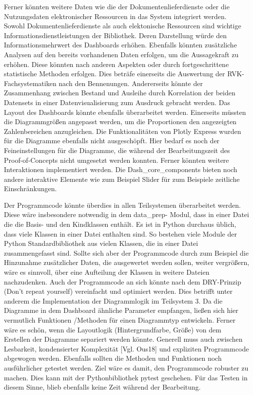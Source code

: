 Ferner könnten weitere Daten wie die der Dokumentenlieferdienste oder die Nutzungsdaten elektronischer Ressourcen in das System integriert werden. Sowohl Dokumentenlieferdienste als auch elektonische Ressourcen sind wichtige Informationsdienstleistungen der Bibliothek. Deren Darstellung würde den Informationsmehrwert des Dashboards erhöhen.
Ebenfalls könnten zusätzliche Analysen auf den bereits vorhandenen Daten erfolgen, um die Aussagekraft zu erhöhen. Diese könnten nach anderen Aspekten oder durch fortgeschrittene statistische Methoden erfolgen. Dies beträfe einerseits die Auswertung der RVK-Fachsystematiken nach den Bennenungen.  Andererseits könnte der Zusammenhang zwischen Bestand und Ausleihe durch Korrelation der beiden Datensets in einer Datenvisualisierung zum Ausdruck gebracht werden.
Das Layout des Dashboards könnte ebenfalls überarbeitet werden. Einerseits müssten die Diagrammgrößen angepasst werden, um die Proportionen den angezeigten Zahlenbereichen anzugleichen. Die Funktionalitäten von Plotly Express wurden für die Diagramme ebenfalls nicht ausgeschöpft. Hier bedarf es noch der Feineinstellungen für die Diagramme, die während der Bearbeitungszeit des Proof-of-Concepts nicht umgesetzt werden konnten.
Ferner könnten weitere Interaktionen implementiert werden. Die Dash_core_components bieten noch andere interaktive Elemente wie zum Beispiel Slider für zum Beispiele zeitliche Einschränkungen. 

Der Programmcode könnte überdies in allen Teilsystemen überarbeitet werden. Diese wäre insbesondere notwendig in dem data_prep- Modul, dass in einer Datei die die Basis- und den Kindklassen enthält. Es ist in Python durchaus üblich, dass viele Klassen in einer Datei enthalten sind. So bestehen viele Module der Python Standardbibliothek aus vielen Klassen, die in einer Datei zusammengefasst sind. Sollte sich aber der Programmcode durch zum Beispiel die Hinzunahme zusätzlicher Daten, die ausgewertet werden sollen, weiter vergrößern, wäre es sinnvoll, über eine Aufteilung der Klassen in weitere Dateien nachzudenken. Auch der Programmcode an sich könnte nach dem DRY-Prinzip (Don’t repeat yourself) vereinfacht und optimiert werden. Dies betrifft unter anderem die Implementation der Diagrammlogik im Teilsystem 3. Da die Diagramme in dem Dashboard ähnliche Parameter empfangen, ließen sich hier vermutlich
Funktionen /Methoden für einen Diagrammtyp entwickeln. Ferner wäre es schön, wenn die Layoutlogik (Hintergrundfarbe, Größe) von dem Erstellen der Diagramme separiert
werden könnte.  Generell muss auch zwischen Lesbarkeit, kondensierter Komplexität [Vgl.
Ous18] und expliziten Programmcode abgewogen werden. Ebenfalls sollten die Methoden
und Funktionen noch ausführlicher getestet werden. Ziel wäre es damit, den Programmcode robuster zu machen. Dies kann mit der Pythonbibliothek pytest geschehen. Für das Testen in diesem Sinne, blieb ebenfalls keine Zeit während der Bearbeitung.

